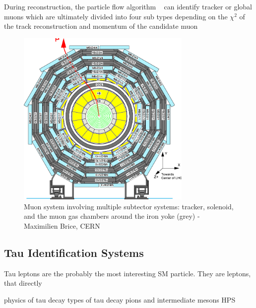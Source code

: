 During reconstruction, the particle flow algorithm ~\cite{CMS-PAS-PFT-09-001} can identify tracker or global muons which are ultimately divided into four sub types depending on the $\chi^2$ of the track reconstruction and momentum of the candidate muon ~\cite{Kratschmer:1956760}


\begin{figure}[ht!b]
  \centering
\includegraphics[width=0.75\textwidth]{figures/Layout-of-the-CMS-barrel-muon-DT-chambers-in-one-of-the-5-wheels-59.png}    
    \caption{\label{fig:muonsystem} Muon system involving multiple subtector systems: tracker, solenoid, and the muon gas chambers around the iron yoke (grey) - Maximilien Brice, CERN }
\end{figure}


\subsection{Tau Identification Systems}
Tau leptons are the probably the most interesting SM particle. They are leptons, that directly

physics of tau decay 
types of tau decay 
pions and intermediate mesons 
HPS


